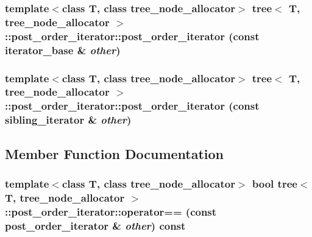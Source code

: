 \hypertarget{classtree_1_1post__order__iterator_bbe898c229fab7e833da744a76aca5ab}{
\subsubsection{\setlength{\rightskip}{0pt plus 5cm}template$<$class T, class tree\_\-node\_\-allocator$>$ {\bf tree}$<$ T, tree\_\-node\_\-allocator $>$::post\_\-order\_\-iterator::post\_\-order\_\-iterator (const {\bf iterator\_\-base} \& {\em other})}}
\label{classtree_1_1post__order__iterator_bbe898c229fab7e833da744a76aca5ab}


\hypertarget{classtree_1_1post__order__iterator_d1bba922181132f5c41a6ebd5230abe9}{
\subsubsection{\setlength{\rightskip}{0pt plus 5cm}template$<$class T, class tree\_\-node\_\-allocator$>$ {\bf tree}$<$ T, tree\_\-node\_\-allocator $>$::post\_\-order\_\-iterator::post\_\-order\_\-iterator (const {\bf sibling\_\-iterator} \& {\em other})}}
\label{classtree_1_1post__order__iterator_d1bba922181132f5c41a6ebd5230abe9}




\subsection{Member Function Documentation}
\hypertarget{classtree_1_1post__order__iterator_b1303f191d6bc8a62e5f03fa53466ec4}{
\subsubsection{\setlength{\rightskip}{0pt plus 5cm}template$<$class T, class tree\_\-node\_\-allocator$>$ bool {\bf tree}$<$ T, tree\_\-node\_\-allocator $>$::post\_\-order\_\-iterator::operator== (const {\bf post\_\-order\_\-iterator} \& {\em other}) const}}
\label{classtree_1_1post__order__iterator_b1303f191d6bc8a62e5f03fa53466ec4}


